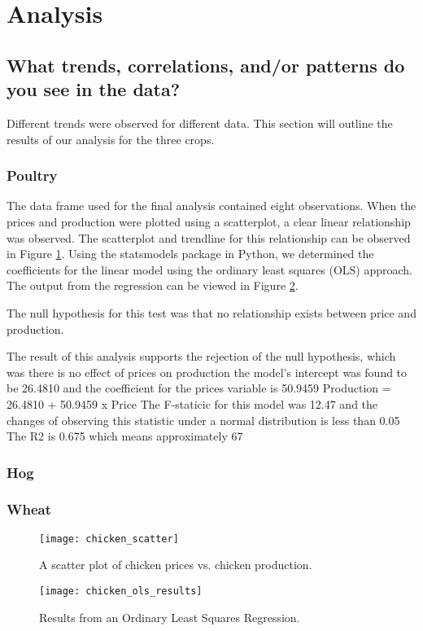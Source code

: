 \section{Analysis}

\subsection{What trends, correlations, and/or patterns do you see in the data?}

Different trends were observed for different data. This section will outline the results of our analysis for the three crops.

\subsubsection{Poultry}

The data frame used for the final analysis contained eight observations.
When the prices and production were plotted using a scatterplot, a clear linear relationship was observed.
The scatterplot and trendline for this relationship can be observed in Figure \ref{fig:chicken_scatter}.
Using the statsmodels package in Python, we determined the coefficients for the linear model using the ordinary least squares (OLS) approach. The output from the regression can be viewed in Figure \ref{fig:chicken_ols}.

The null hypothesis for this test was that no relationship exists between price and production.

The result of this analysis supports the rejection of the null hypothesis, which was there is no effect of prices on production
the model’s intercept was found to be 26.4810 and the coefficient for the prices variable is 50.9459
Production = 26.4810 + 50.9459 x Price
The F-staticic for this model was 12.47 and the changes of observing this statistic under a normal distribution is less than 0.05 %
The R2 is 0.675 which means approximately 67%

\subsubsection{Hog}

\subsubsection{Wheat}



\begin{figure}
    \texttt{[image: chicken\_scatter]}
    \caption{A scatter plot of chicken prices vs. chicken production.}
    \label{fig:chicken_scatter}
\end{figure}



\begin{figure}
    \texttt{[image: chicken\_ols\_results]}
    \caption{Results from an Ordinary Least Squares Regression.}
    \label{fig:chicken_ols}
\end{figure}